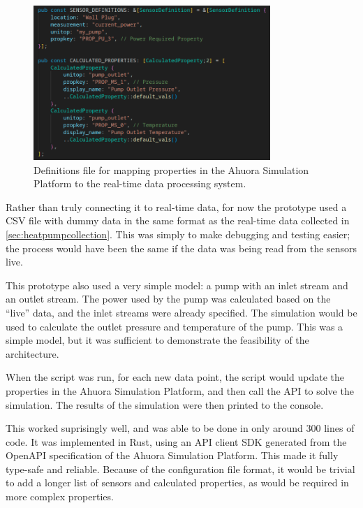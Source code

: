 \begin{figure}
    \centering
    \includegraphics[width=0.8\textwidth]{live_constants.png}
    \caption{Definitions file for mapping properties in the Ahuora Simulation Platform to the real-time data processing system.}
    \label{fig:live-constants}
\end{figure}

Rather than truly connecting it to real-time data, for now the prototype used a CSV file with dummy data in the same format as the real-time data collected in \cref{sec:heatpumpcollection}. 
This was simply to make debugging and testing easier; the process would have been the same if the data was being read from the sensors live.

This prototype also used a very simple model: a pump with an inlet stream and an outlet stream. 
The power used by the pump was calculated based on the  ``live'' data, and the inlet streams were already specified. 
The simulation would be used to calculate the outlet pressure and temperature of the pump. This was a simple model, but it was sufficient to demonstrate the feasibility of the architecture.


When the script was run, for each new data point, the script would update the properties in the Ahuora Simulation Platform, and then call the API to solve the simulation. The results of the simulation were then printed to the console. 

This worked suprisingly well, and was able to be done in only around 300 lines of code. 
It was implemented in Rust, using an API client SDK generated from the OpenAPI specification of the Ahuora Simulation Platform. 
This made it fully type-safe and reliable. 
Because of the configuration file format, it would be trivial to add a longer list of sensors and calculated properties, as would be required in more complex properties.

